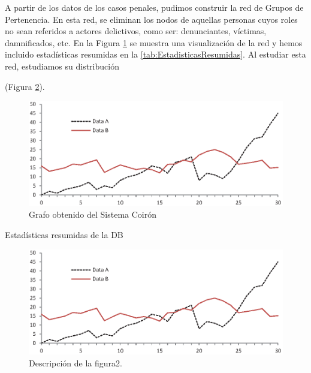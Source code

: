 A partir de los datos de los casos penales, pudimos
construir la red de Grupos de Pertenencia. En esta red, se eliminan los nodos de aquellas personas cuyos roles no sean referidos a actores delictivos, como ser: denunciantes, víctimas, damnificados, etc. En la Figura \ref{fig:grafocompleto} se muestra una visualización de la red y hemos incluido estadísticas resumidas en la \ref{tab:EstadisticasResumidas}.
Al estudiar esta red, estudiamos su distribución 

(Figura \ref{fig:otrafigura}). 

\begin{figure}
	\centering
	\includegraphics[width=\textwidth]{fig1.eps}
	\caption{Grafo obtenido del Sistema Coirón} 
	\label{fig:grafocompleto}
\end{figure}

\begin{table}
	\caption{Estadísticas resumidas de la DB}
	\label{tab:EstadisticasResumidas}
\end{table}

\begin{figure}
	\includegraphics[width=\textwidth]{fig1.eps}
	\caption{Descripción de la figura2.} 
	\label{fig:otrafigura}
\end{figure}